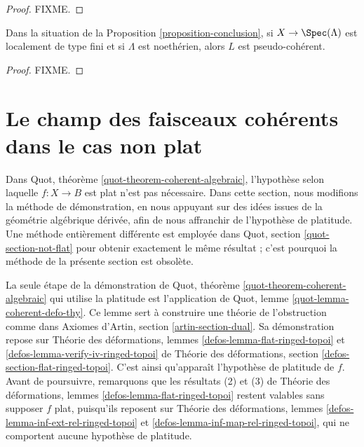 \begin{proof}
FIXME.
\end{proof}

\begin{lemma}
\label{lemma-pseudo-coherent}
Dans la situation de la Proposition \ref{proposition-conclusion}, si
$X \to \Spec(\Lambda)$ est localement de type fini et si $\Lambda$ est
noeth\'erien, alors $L$ est pseudo-coh\'erent.
\end{lemma}

\begin{proof}
FIXME.
\end{proof}


\section{Le champ des faisceaux cohérents dans le cas non plat}
\label{section-not-flat}

\noindent
Dans Quot, théorème \ref{quot-theorem-coherent-algebraic},
l'hypothèse selon laquelle $f : X \to B$ est plat n'est pas nécessaire.
Dans cette section, nous modifions la méthode de démonstration, en nous
appuyant sur des idées issues de la géométrie algébrique dérivée, afin de nous
affranchir de l'hypothèse de platitude. Une méthode entièrement différente est
employée dans Quot, section \ref{quot-section-not-flat} pour obtenir exactement
le même résultat ; c'est pourquoi la méthode de la présente section est
obsolète.

\medskip\noindent
La seule étape de la démonstration de
Quot, théorème \ref{quot-theorem-coherent-algebraic}
qui utilise la platitude est l'application de
Quot, lemme \ref{quot-lemma-coherent-defo-thy}.
Ce lemme sert à construire une théorie de l'obstruction comme dans
Axiomes d'Artin, section \ref{artin-section-dual}.
Sa démonstration repose sur
Théorie des déformations, lemmes \ref{defos-lemma-flat-ringed-topoi} et
\ref{defos-lemma-verify-iv-ringed-topoi} de
Théorie des déformations, section \ref{defos-section-flat-ringed-topoi}.
C'est ainsi qu'apparaît l'hypothèse de platitude de $f$.
Avant de poursuivre, remarquons que les résultats (2) et (3) de
Théorie des déformations, lemmes \ref{defos-lemma-flat-ringed-topoi}
restent valables sans supposer $f$ plat, puisqu'ils reposent sur
Théorie des déformations, lemmes \ref{defos-lemma-inf-ext-rel-ringed-topoi}
et \ref{defos-lemma-inf-map-rel-ringed-topoi},
qui ne comportent aucune hypothèse de platitude.

